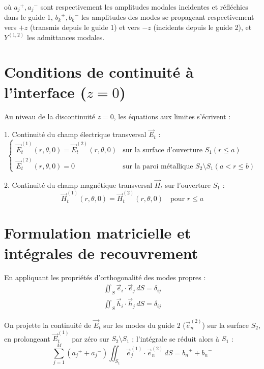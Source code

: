 \documentclass[12pt,a4paper]{report}
\begin{document}
où ${a_j}^{+}, {a_j}^{-}$ sont respectivement les amplitudes modales incidentes et réfléchies dans le guide 1, ${b_k}^{+}, {b_k}^{-}$ les amplitudes des modes se propageant respectivement vers $+z$ (transmis depuis le guide 1) et vers $-z$ (incidents depuis le guide 2), et $Y^{(1,2)}$ les admittances modales.

\section{Conditions de continuité à l'interface ($z = 0$)}
Au niveau de la discontinuité $z = 0$, les équations aux limites s'écrivent :

1. Continuité du champ électrique transversal $\vec{E}_t$ :
\begin{equation}
\begin{cases} 
\vec{E}_t^{(1)}(r,\theta,0) = \vec{E}_t^{(2)}(r,\theta,0) & \text{sur la surface d'ouverture } S_1 (r \le a) \\
\vec{E}_t^{(2)}(r,\theta,0) = 0 & \text{sur la paroi métallique } S_2 \setminus S_1 (a < r \le b)
\end{cases}
\end{equation}

2. Continuité du champ magnétique transversal $\vec{H}_t$ sur l'ouverture $S_1$ :
\begin{equation}
\vec{H}_t^{(1)}(r,\theta,0) = \vec{H}_t^{(2)}(r,\theta,0) \quad \text{pour } r \le a
\end{equation}

\section{Formulation matricielle et intégrales de recouvrement}
En appliquant les propriétés d'orthogonalité des modes propres :
\begin{align}
\iint_{S} \vec{e}_i \cdot \vec{e}_j \, dS = \delta_{ij} \\
\iint_{S} \vec{h}_i \cdot \vec{h}_j \, dS = \delta_{ij}
\end{align}

On projette la continuité de $\vec{E}_t$ sur les modes du guide 2 ($\vec{e}_n^{(2)}$) sur la surface $S_2$, en prolongeant $\vec{E}_t^{(1)}$ par zéro sur $S_2 \setminus S_1$ ; l'intégrale se réduit alors à $S_1$ :
\begin{equation}
\sum_{j=1}^{M} \left( {a_j}^{+} + {a_j}^{-} \right) \iint_{S_1} \vec{e}_j^{(1)} \cdot \vec{e}_n^{(2)} \, dS = {b_n}^{+} + {b_n}^{-}
\end{equation}
\end{document}
